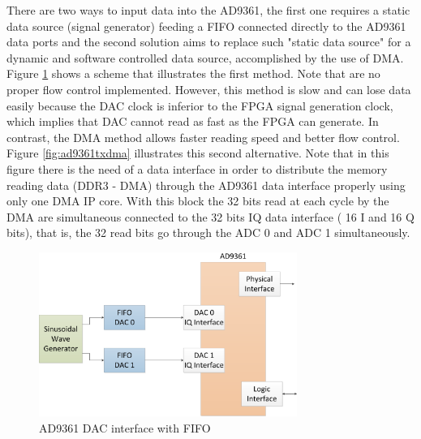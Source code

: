 
There are two ways to input data into the AD9361, the first one requires a
static data source (signal generator) feeding a FIFO connected directly to the
AD9361 data ports and the second solution aims to replace such "static data
source" for a dynamic and software controlled data source, accomplished by the
use of DMA. Figure \ref{fig:ad9361txfifo} shows a scheme that illustrates the
first method. Note that are no proper flow control implemented. However, this
method is slow and can lose data easily because the DAC clock is inferior to the
FPGA signal generation clock, which implies that DAC cannot read as fast as the
FPGA can generate. In contrast, the DMA method allows faster reading speed and
better flow control. Figure \ref{fig:ad9361txdma} illustrates this second
alternative. Note that in this figure there is the need of a data interface in
order to distribute the memory reading data (DDR3 - DMA) through the AD9361 data
interface properly using only one DMA IP core. With this block the 32 bits read
at each cycle by the DMA are simultaneous connected to the 32 bits IQ data
interface ( 16 I and 16 Q bits), that is, the 32 read bits go through the ADC 0
and ADC 1 simultaneously.


\begin{figure}[htbp]
    \centering
    \includegraphics[width=0.75\textwidth]{./figures/dac_fifo}
    \caption{ AD9361 DAC interface with FIFO
    \label{fig:ad9361txfifo}}
\end{figure}

